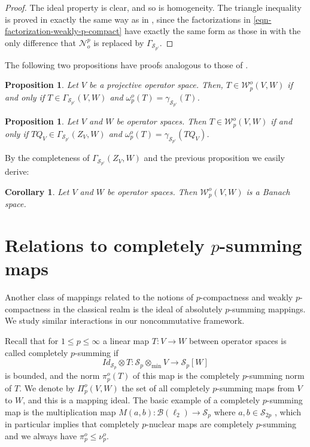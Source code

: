 \documentclass[11pt]{amsart}
\newtheorem{corollary}[theorem]{Corollary}
\newtheorem{proposition}[theorem]{Proposition}
\numberwithin{equation}{section}
\begin{document}
\begin{proof}
The ideal property is clear, and so is homogeneity.
The triangle inequality is proved in exactly the same way as in \cite[Prop. 3.3]{ChaDiGa-Operator-p-compact}, since the factorizations in \eqref{eqn-factorization-weakly-p-compact} have exactly the same form as those in \cite[Def. 3.2]{ChaDiGa-Operator-p-compact} with the only difference that $\mathcal{N}_o^p$ is replaced by $\Gamma_{\mathcal{S}_{p'}}$.
\end{proof}

The following two propositions have proofs analogous to those of \cite[Prop. 3.7 and 3.8]{ChaDiGa-Operator-p-compact}.

\begin{proposition}
Let $V$ be a projective operator space. Then, $T \in  \mathcal{W}_p^o(V,W)$ if and only if $T \in \Gamma_{\mathcal{S}_{p'}}(V,W)$ and $\omega_p^o(T) = \gamma_{\mathcal{S}_{p'}}(T)$. 
\end{proposition}

\begin{proposition}\label{prop-Wp-is-Gamma-p-sur}
Let $V$ and $W$ be operator spaces. Then $T \in  \mathcal{W}_p^o(V,W)$ if and only if $T  Q_V \in \Gamma_{\mathcal{S}_{p'}}(Z_V,W)$ and $\omega_p^o(T) = \gamma_{\mathcal{S}_{p'}}(T Q_V)$.    
\end{proposition}

By the completeness of $\Gamma_{\mathcal{S}_{p'}}(Z_V,W)$ and the previous proposition we easily derive:

\begin{corollary}
   Let $V$ and $W$ be operator spaces. Then $\mathcal{W}_p^o(V,W)$ is a Banach space.
\end{corollary}






\section{Relations to completely $p$-summing maps}\label{sect-completely-summing}

Another class of mappings related to the notions of $p$-compactness and weakly $p$-compactness in the classical realm is the ideal of absolutely $p$-summing mappings. We study similar interactions in our noncommutative framework.

Recall that for $1 \le p \le \infty$ a linear map $T : V \to W$ between operator spaces is called completely $p$-summing \cite[Chap. 5]{Pisier-Asterisque} if 
\[
Id_{\mathcal{S}_p}\otimes T : \mathcal{S}_p \otimes_{\min} V \to \mathcal{S}_p[W]
\]
is bounded, and the norm $\pi^o_p(T)$ of this map is the completely $p$-summing norm of $T$.
We denote by $\Pi_p^o(V,W)$ the set of all completely $p$-summing maps from $V$ to $W$, and this is a mapping ideal.
The basic example of a completely $p$-summing map is the multiplication map $M(a,b) : \mathcal{B}(\ell_2) \to \mathcal{S}_p$ where $a,b \in \mathcal{S}_{2p}$
\cite[Prop. 5.6]{Pisier-Asterisque}, which in particular implies that completely $p$-nuclear maps are completely $p$-summing and we always have $\pi_p^o \le \nu_p^o$.
\end{document}

